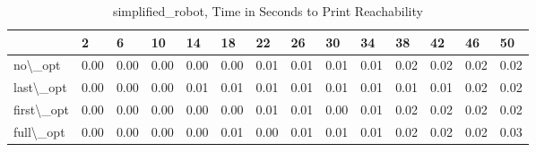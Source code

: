\begin{table}
\centering
\caption{simplified\_robot, Time in Seconds to Print Reachability}
\label{simplified_robot_states_time}
\begin{tabular}{llllllllllllll}
\toprule
{} &     2 &     6 &    10 &    14 &    18 &    22 &    26 &    30 &    34 &    38 &    42 &    46 &    50 \\
\midrule
no\textbackslash \_opt    &  0.00 &  0.00 &  0.00 &  0.00 &  0.00 &  0.01 &  0.01 &  0.01 &  0.01 &  0.02 &  0.02 &  0.02 &  0.02 \\
last\textbackslash \_opt  &  0.00 &  0.00 &  0.00 &  0.01 &  0.01 &  0.01 &  0.01 &  0.01 &  0.01 &  0.01 &  0.01 &  0.02 &  0.02 \\
first\textbackslash \_opt &  0.00 &  0.00 &  0.00 &  0.00 &  0.00 &  0.01 &  0.01 &  0.00 &  0.01 &  0.02 &  0.02 &  0.02 &  0.02 \\
full\textbackslash \_opt  &  0.00 &  0.00 &  0.00 &  0.00 &  0.01 &  0.00 &  0.01 &  0.01 &  0.01 &  0.02 &  0.02 &  0.02 &  0.03 \\
\bottomrule
\end{tabular}
\end{table}

